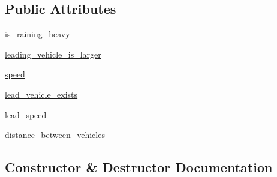 \subsection*{Public Attributes}
\begin{DoxyCompactItemize}
\item 
\hyperlink{classimplementation_1_1bayesian__network_1_1inference_1_1sinadra__risk__sensor__data_1_1_data1_lane_follow___simple_a209feedf443058990d9cb09e7fefbd34}{is\+\_\+raining\+\_\+heavy}
\item 
\hyperlink{classimplementation_1_1bayesian__network_1_1inference_1_1sinadra__risk__sensor__data_1_1_data1_lane_follow___simple_a4a8855348e29d247d0704fb348567875}{leading\+\_\+vehicle\+\_\+is\+\_\+larger}
\item 
\hyperlink{classimplementation_1_1bayesian__network_1_1inference_1_1sinadra__risk__sensor__data_1_1_data1_lane_follow___simple_ac3cff3aa6903cafb847756a4a7e17b2e}{speed}
\item 
\hyperlink{classimplementation_1_1bayesian__network_1_1inference_1_1sinadra__risk__sensor__data_1_1_data1_lane_follow___simple_a86f235230b034c4e5201580a6b5db49c}{lead\+\_\+vehicle\+\_\+exists}
\item 
\hyperlink{classimplementation_1_1bayesian__network_1_1inference_1_1sinadra__risk__sensor__data_1_1_data1_lane_follow___simple_a87795cd1b68c686c7c4c2998c27fee96}{lead\+\_\+speed}
\item 
\hyperlink{classimplementation_1_1bayesian__network_1_1inference_1_1sinadra__risk__sensor__data_1_1_data1_lane_follow___simple_a46fccba30151cb5e700580ed0436c98e}{distance\+\_\+between\+\_\+vehicles}
\end{DoxyCompactItemize}


\subsection{Constructor \& Destructor Documentation}
\mbox{\label{classimplementation_1_1bayesian__network_1_1inference_1_1sinadra__risk__sensor__data_1_1_data1_lane_follow___simple_a7f5f0d89e08e9605ebab8762ad3ab0fd}} 
